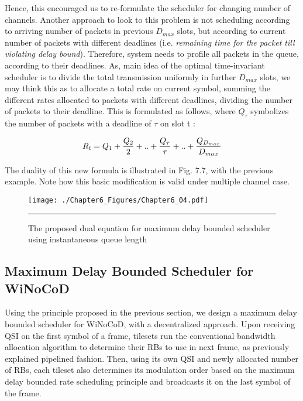 Hence, this encouraged us to re-formulate the scheduler for changing number of channels. Another approach to look to this problem is not scheduling according to arriving number of packets in previous $D_{max}$ slots, but according to current number of packets with different deadlines (i.e. \textit{remaining time for the packet till violating delay bound}). Therefore, system needs to profile all packets in the queue, according to their deadlines. As, main idea of the optimal time-invariant scheduler is to divide the total transmission uniformly in further $D_{max}$ slots, we may think this as to allocate a total rate on current symbol, summing the different rates allocated to packets with different deadlines, dividing the number of packets to their deadline. This is formulated as follows, where $Q_{\tau}$ symbolizes the number of packets with a deadline of $\tau$ on slot t : 

\begin{align}
R_{t} =  {Q_{1} + {Q_{2}\over {2}} + .. + {Q_{\tau}\over {\tau}} + .. + {Q_{D_{max}} \over {D_{max}}}} 
\end{align}

The duality of this new formula is illustrated in Fig. 7.7, with the previous example. Note how this basic modification is valid under multiple channel case. 

\begin{figure}[htbp]
  \centering
    \texttt{[image: ./Chapter6\_Figures/Chapter6\_04.pdf]}
    \rule{35em}{0.5pt}
  \caption[The proposed dual equation for maximum delay bounded scheduler]{The proposed dual equation for maximum delay bounded scheduler using instantaneous queue length} 
  \label{fig:Electron}
\end{figure}

\subsection{Maximum Delay Bounded Scheduler for WiNoCoD}

Using the principle proposed in the previous section, we design a maximum delay bounded scheduler for WiNoCoD, with a decentralized approach. Upon receiving QSI on the first symbol of a frame, tilesets run the conventional bandwidth allocation algorithm to determine their RBs to use in next frame, as previously explained pipelined fashion. Then, using its own QSI and newly allocated number of RBs, each tileset also determines its modulation order based on the maximum delay bounded rate scheduling principle and broadcasts it on the last symbol of the frame. 

